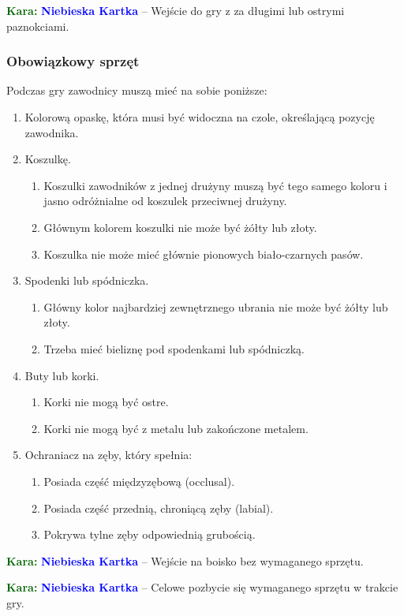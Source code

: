 \documentclass[11pt,a4paper]{article}
\newcommand\bluecard[1]{\bgroup\textcolor{darkgreen}{\textbf{Kara: }}\bgroup\textcolor{blue}{\textbf{Niebieska Kartka}} -- #1}
\begin{document}
\bluecard{Wejście do gry z za długimi lub ostrymi paznokciami.}

\subsubsection{Obowiązkowy sprzęt}
Podczas gry zawodnicy muszą mieć na sobie poniższe:
\begin{enumerate}
  \item Kolorową opaskę, która musi być widoczna na czole, określającą pozycję zawodnika.
  \item Koszulkę.
  \begin{enumerate}
    \item Koszulki zawodników z jednej drużyny muszą być tego samego koloru i jasno odróżnialne od koszulek przeciwnej drużyny.
    \item Głównym kolorem koszulki nie może być żółty lub złoty.
    \item Koszulka nie może mieć głównie pionowych biało-czarnych pasów.
  \end{enumerate}
  \item Spodenki lub spódniczka.
  \begin{enumerate}
    \item Główny kolor najbardziej zewnętrznego ubrania nie może być żółty lub złoty.
    \item Trzeba mieć bieliznę pod spodenkami lub spódniczką.
  \end{enumerate}
  \item Buty lub korki.
  \begin{enumerate}
    \item Korki nie mogą być ostre.
    \item Korki nie mogą być z metalu lub zakończone metalem.
  \end{enumerate}
  \item Ochraniacz na zęby, który spełnia:
  \begin{enumerate}
    \item Posiada część międzyzębową (occlusal).
    \item Posiada część przednią, chroniącą zęby (labial).
    \item Pokrywa tylne zęby odpowiednią grubością.
  \end{enumerate}
\end{enumerate}

\bluecard{Wejście na boisko bez wymaganego sprzętu.}

\bluecard{Celowe pozbycie się wymaganego sprzętu w trakcie gry.}
\end{document}
